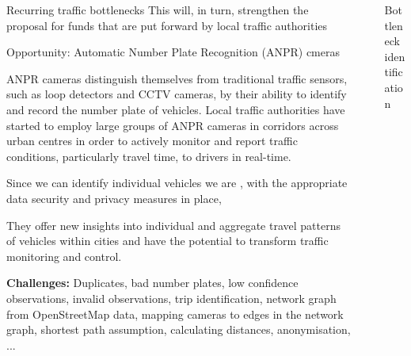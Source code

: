 \documentclass[final]{beamer}
\newlength{\sepwidth}
\newlength{\colwidth}
\newcommand{\separatorcolumn}{\begin{column}{\sepwidth}\end{column}}
\begin{document}
\begin{frame}[t]
\begin{columns}[t]
\begin{column}{\colwidth}
\begin{block}{Recurring traffic bottlenecks}
    This will, in turn, strengthen the proposal for funds  that are put forward by
    local traffic authorities


  \end{block}

  \begin{alertblock}{Opportunity: Automatic Number Plate Recognition (ANPR) cmeras}

    ANPR cameras distinguish themselves from traditional traffic sensors, such
    as loop detectors and CCTV cameras, by their ability to identify and record
    the number plate of vehicles. Local traffic authorities have started to
    employ large groups of ANPR cameras in corridors across urban centres in
    order to actively monitor and report traffic conditions, particularly travel
    time, to drivers in real-time.

    Since we can identify individual vehicles we are , with the appropriate
    data security and privacy measures in place,

    They offer new insights into individual and aggregate travel patterns of
    vehicles within cities and have the potential to transform traffic
    monitoring and control.

    \textbf{Challenges:} Duplicates, bad number plates, low confidence
    observations, invalid observations, trip identification, network graph
    from OpenStreetMap data, mapping cameras to edges in the network graph,
     shortest path assumption, calculating distances, anonymisation, ...


  \end{alertblock}

\end{column}

\separatorcolumn

\begin{column}{\colwidth}

  \begin{block}{Bottleneck identification }



\end{block}
\end{column}
\end{columns}
\end{frame}
\end{document}
